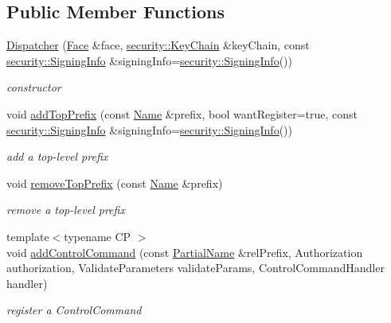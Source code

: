 \subsection*{Public Member Functions}
\begin{DoxyCompactItemize}
\item 
\hyperlink{classndn_1_1mgmt_1_1Dispatcher_a0594a5cfdf6d1f6689e84a053c96a446}{Dispatcher} (\hyperlink{classndn_1_1Face}{Face} \&face, \hyperlink{classndn_1_1security_1_1KeyChain}{security\+::\+Key\+Chain} \&key\+Chain, const \hyperlink{classndn_1_1security_1_1SigningInfo}{security\+::\+Signing\+Info} \&signing\+Info=\hyperlink{classndn_1_1security_1_1SigningInfo}{security\+::\+Signing\+Info}())
\begin{DoxyCompactList}\small\item\em constructor \end{DoxyCompactList}\item 
void \hyperlink{classndn_1_1mgmt_1_1Dispatcher_aca143d0c83f9ab57a1600fa2d0d198a4}{add\+Top\+Prefix} (const \hyperlink{classndn_1_1Name}{Name} \&prefix, bool want\+Register=true, const \hyperlink{classndn_1_1security_1_1SigningInfo}{security\+::\+Signing\+Info} \&signing\+Info=\hyperlink{classndn_1_1security_1_1SigningInfo}{security\+::\+Signing\+Info}())
\begin{DoxyCompactList}\small\item\em add a top-\/level prefix \end{DoxyCompactList}\item 
void \hyperlink{classndn_1_1mgmt_1_1Dispatcher_ad16e57b365e2ce41f3d2abcefad96ce7}{remove\+Top\+Prefix} (const \hyperlink{classndn_1_1Name}{Name} \&prefix)
\begin{DoxyCompactList}\small\item\em remove a top-\/level prefix \end{DoxyCompactList}\item 
{\footnotesize template$<$typename CP $>$ }\\void \hyperlink{classndn_1_1mgmt_1_1Dispatcher_a3e17c8064814217809e887a782fde39b}{add\+Control\+Command} (const \hyperlink{namespacendn_a687f9be727f562d4d77b9b4752e90140}{Partial\+Name} \&rel\+Prefix, Authorization authorization, Validate\+Parameters validate\+Params, Control\+Command\+Handler handler)
\begin{DoxyCompactList}\small\item\em register a Control\+Command \end{DoxyCompactList}\item 

\end{DoxyCompactItemize}
